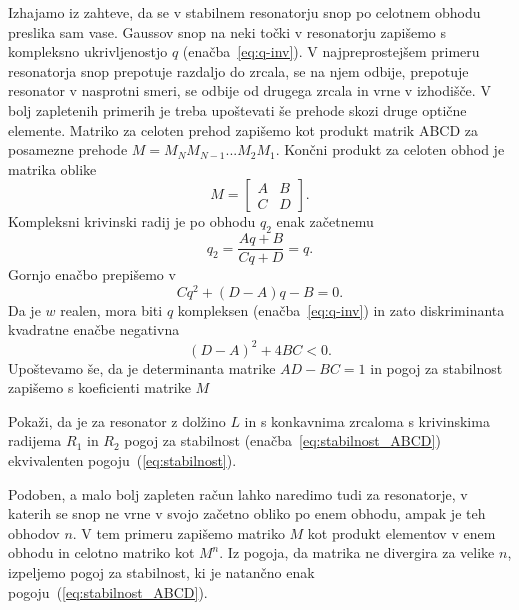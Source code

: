 Izhajamo iz zahteve, da se v stabilnem resonatorju snop po celotnem obhodu
preslika sam vase. Gaussov snop na neki točki v resonatorju 
zapišemo s kompleksno ukrivljenostjo $q$ (enačba~\ref{eq:q-inv}).
V najpreprostejšem primeru resonatorja snop prepotuje razdaljo do zrcala, se na njem 
odbije, prepotuje resonator v nasprotni smeri, se odbije od drugega zrcala in vrne 
v izhodišče. V bolj zapletenih primerih je treba upoštevati še 
prehode skozi druge optične elemente. Matriko 
za celoten prehod zapišemo kot produkt matrik ABCD za posamezne prehode $M = M_N M_{N-1} ...M_2 M_1$.
Končni produkt za celoten obhod je matrika oblike
\begin{equation}
M = \left[\begin{array}{cc}
A & B\\
C & D
\end{array}\right].
\end{equation}
Kompleksni krivinski radij je po obhodu $q_2$ enak začetnemu
\begin{equation}
q_2 = \frac{Aq+B}{Cq+D} = q.
\end{equation}
Gornjo enačbo prepišemo v 
\begin{equation}
Cq^2+(D-A)q-B=0.
\end{equation}
Da je $w$ realen, mora biti $q$ kompleksen (enačba~\ref{eq:q-inv}) 
in zato diskriminanta kvadratne enačbe negativna
\begin{equation}
(D-A)^2+ 4BC<0.
\end{equation}
Upoštevamo še, da je determinanta matrike $AD-BC=1$ in pogoj za 
stabilnost zapišemo s koeficienti matrike $M$

\begin{definition}
Pokaži, da je za resonator z dolžino $L$ in s konkavnima zrcaloma s krivinskima radijema $R_1$ in $R_2$ 
pogoj za stabilnost (enačba~\ref{eq:stabilnost_ABCD}) ekvivalenten pogoju~(\ref{eq:stabilnost}).
\end{definition}

\begin{remark}
Podoben, a malo bolj zapleten račun lahko naredimo tudi za resonatorje, v katerih se snop 
ne vrne v svojo začetno obliko po enem obhodu, ampak je teh obhodov $n$. V tem primeru zapišemo
matriko $M$ kot produkt elementov v enem obhodu in celotno matriko kot $M^n$. Iz pogoja,
da matrika ne divergira za velike $n$, izpeljemo pogoj za stabilnost, ki je natančno 
enak pogoju~(\ref{eq:stabilnost_ABCD}). 
\end{remark}


